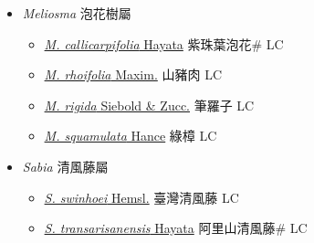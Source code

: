 
  \begin{itemize}
 \item[] \textit{Meliosma} 泡花樹屬
                    
  \begin{itemize}
        \item[] \href{http://www.theplantlist.org/tpl1.1/search?q=Meliosma+callicarpifolia}{\textit{M. callicarpifolia} Hayata}   紫珠葉泡花\# LC
        \item[] \href{http://www.theplantlist.org/tpl1.1/search?q=Meliosma+rhoifolia}{\textit{M. rhoifolia} Maxim.}   山豬肉 LC
        \item[] \href{http://www.theplantlist.org/tpl1.1/search?q=Meliosma+rigida}{\textit{M. rigida} Siebold \& Zucc.}   筆羅子 LC
        \item[] \href{http://www.theplantlist.org/tpl1.1/search?q=Meliosma+squamulata}{\textit{M. squamulata} Hance}   綠樟 LC
  \end{itemize}
 \item[] \textit{Sabia} 清風藤屬
                    
  \begin{itemize}
        \item[] \href{http://www.theplantlist.org/tpl1.1/search?q=Sabia+swinhoei}{\textit{S. swinhoei} Hemsl.}   臺灣清風藤 LC
        \item[] \href{http://www.theplantlist.org/tpl1.1/search?q=Sabia+transarisanensis}{\textit{S. transarisanensis} Hayata}   阿里山清風藤\# LC
  \end{itemize}
  \end{itemize}
